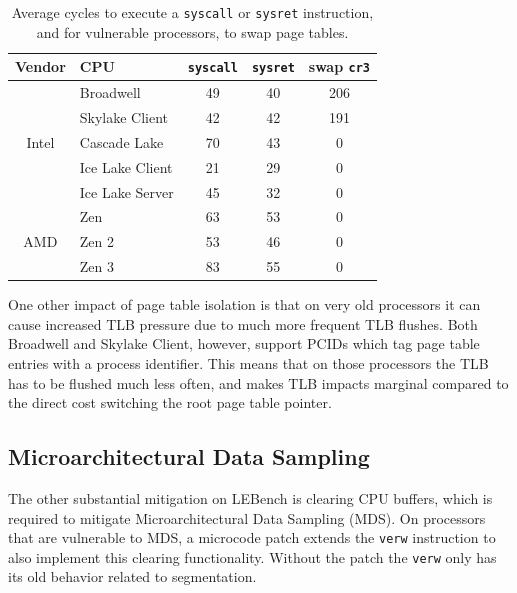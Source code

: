 \begin{table}[h]
  \begin{center}
  \begin{tabular}{clccc} 
    \textbf{Vendor} & \textbf{CPU} & \textbf{\texttt{syscall}} & \textbf{\texttt{sysret}}  & \textbf{swap \texttt{cr3}} \\ \hline 
    \multirow{5}{*}{Intel} & Broadwell             & 49 & 40 & 206 \\
                           & Skylake Client        & 42 & 42 & 191 \\
                           & Cascade Lake          & 70 & 43 & 0 \\
                           & Ice Lake Client       & 21 & 29 & 0 \\
                           & Ice Lake Server       & 45 & 32 & 0 \\ \hline
      \multirow{3}{*}{AMD} & Zen                   & 63 & 53 & 0 \\
                           & Zen 2                 & 53 & 46 & 0 \\
                           & Zen 3                 & 83 & 55 & 0 \\ \hline
  \end{tabular}
  \end{center}
  \caption{Average cycles to execute a \texttt{syscall} or \texttt{sysret} instruction, and for vulnerable processors, to swap page tables. }
  \label{table:meltdown}
\end{table}

One other impact of page table isolation is that on very old processors it can cause increased TLB pressure due to much more frequent TLB flushes.
Both Broadwell and Skylake Client, however, support PCIDs which tag page table entries with a process identifier.
This means that on those processors the TLB has to be flushed much less often, and makes TLB impacts marginal compared to the direct cost switching the root page table pointer.

\subsection{Microarchitectural Data Sampling}

The other substantial mitigation on LEBench is clearing CPU buffers, which is required to mitigate Microarchitectural Data Sampling (MDS).
On processors that are vulnerable to MDS, a microcode patch extends the \texttt{verw} instruction to also implement this clearing functionality.
Without the patch the \texttt{verw} only has its old behavior related to segmentation.

